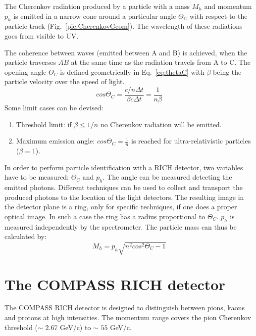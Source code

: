 The Cherenkov radiation produced by a particle with a mass $M_h$ and momentum $p_h$ is emitted in a narrow cone around a particular angle $\Theta_C$ with respect to the particle track (Fig.~\ref{pic:CherenkovGeom}). The wavelength of these radiations goes from visible to UV.

The coherence between waves (emitted between A and B) is achieved, when the particle traverses $\overline{AB}$ at the same time as the radiation travels from A to C. The opening angle $\Theta_C$ is defined geometrically in Eq.~\ref{eq:thetaC} with $\beta$ being the particle velocity over the speed of light.
%
\begin{equation}
  cos\Theta_C = \frac{c/n \Delta t}{\beta c \Delta t} = \frac{1}{n\beta}
  \label{eq:thetaC}
\end{equation}
%
Some limit cases can be devised:
\begin{enumerate}
  \item Threshold limit: if $\beta \leq 1/n$ no Cherenkov radiation will be emitted.
  \item Maximum emission angle: $cos \Theta_C = \frac{1}{n}$ is reached for ultra-relativistic particles ($\beta = 1$).
\end{enumerate}

In order to perform particle identification with a RICH detector, two variables have to be measured: $\Theta_C$ and $p_h$. The angle can be measured detecting the emitted photons. Different techniques can be used to collect and transport the produced photons to the location of the light detectors. The resulting image in the detector plane is a ring, only for specific techniques, if one does a proper optical image. In such a case the ring has a radius proportional to $\Theta_C$. $p_h$ is measured independently by the spectrometer. The particle mass can thus be calculated by:
%
\begin{equation}
  M_h = p_h \sqrt{n^2 cos^2 \Theta_C -1}
\end{equation}


\section{The COMPASS RICH detector}

The COMPASS RICH detector is designed to distinguish between pions, kaons and protons at high intensities. The momentum range covers the pion Cherenkov threshold ($\sim$ $2.67$ GeV/c) to $\sim$ $55$ GeV/c.

